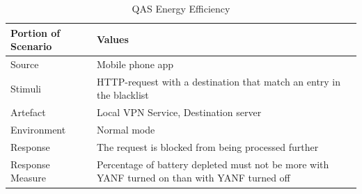 \documentclass[main.tex]{subfiles}
\begin{document}
\begin{table}[H]
    \centering
    \begin{tabular}{|p{5cm}|p{8cm}|} \hline
        \textbf{Portion of Scenario}& \textbf{Values}   \\ \hline
        Source                      & Mobile phone app   \\ \hline
        Stimuli                     & HTTP-request with a destination that match an entry in the blacklist    \\ \hline
        Artefact                    & Local VPN Service, Destination server  \\ \hline
        Environment                 & Normal mode   \\ \hline
        Response                    & The request is blocked from being processed further  \\ \hline
        Response Measure            & Percentage of battery depleted must not be more with YANF turned on than with YANF turned off \\ \hline
    \end{tabular}
    \caption{QAS Energy Efficiency}
    \label{tab:EnergyScenario}
\end{table}



\end{document}
